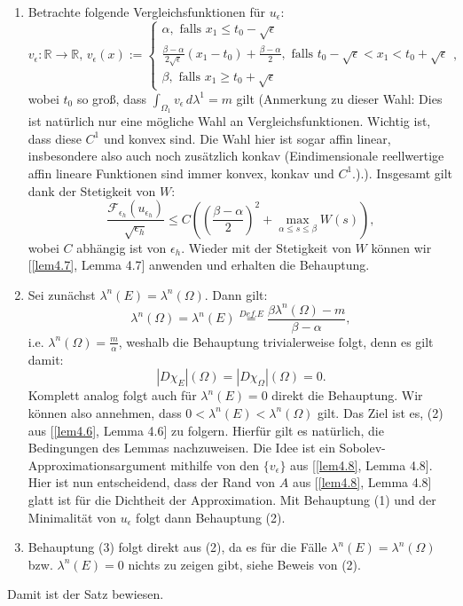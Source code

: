 \begin{enumerate}
\item Betrachte folgende Vergleichsfunktionen für \(u_{\epsilon}\):
\begin{equation}
    v_{\epsilon} : \mathbb{R} \to \mathbb{R}, \, v_{\epsilon}(x) := \begin{cases}
        \alpha, \text{ falls }x_1 \leq t_0 - \sqrt{\epsilon}\\
        \frac{\beta - \alpha}{2 \sqrt{\epsilon}}(x_1 - t_0) + \frac{\beta - \alpha}{2}, \text{ falls }t_0 - \sqrt{\epsilon} < x_1 < t_0 + \sqrt{\epsilon}\\
        \beta, \text{ falls }x_1 \geq t_0 + \sqrt{\epsilon}
    \end{cases},
\end{equation}
wobei \(t_0\) so groß, dass \(\int_{\Omega_1} v_{\epsilon} \, d\lambda^1 = m\) gilt (Anmerkung zu dieser Wahl: Dies ist natürlich nur eine mögliche Wahl an Vergleichsfunktionen. Wichtig ist, dass diese \(C^1\) und konvex sind. Die Wahl hier ist sogar affin linear, insbesondere also auch noch zusätzlich konkav (Eindimensionale reellwertige affin lineare Funktionen sind immer konvex, konkav und \(C^1\).).). Insgesamt gilt dank der Stetigkeit von \(W\):
\begin{equation}
    \frac{\mathcal{F}_{\epsilon_h}(u_{\epsilon_h})}{\sqrt{\epsilon_h}} \leq C((\frac{\beta - \alpha}{2})^2 + \max_{\alpha \leq s \leq \beta} W(s)),
\end{equation}
wobei \(C\) abhängig ist von \(\epsilon_h\). Wieder mit der Stetigkeit von \(W\) können wir [\ref{lem4.7}, Lemma 4.7] anwenden und erhalten die Behauptung.
\item Sei zunächst \(\lambda^n(E) = \lambda^n(\Omega)\). Dann gilt:
\begin{equation}
    \lambda^n(\Omega) = \lambda^n(E) \stackrel{Def. E}{=} \frac{\beta \lambda^n(\Omega) - m}{\beta - \alpha},
\end{equation}
i.e. \(\lambda^n(\Omega) = \frac{m}{\alpha}\), weshalb die Behauptung trivialerweise folgt, denn es gilt damit:
\begin{equation}
    |D\chi_E|(\Omega) = |D\chi_{\Omega}|(\Omega) = 0.
\end{equation}
Komplett analog folgt auch für \(\lambda^n(E) = 0\) direkt die Behauptung. Wir können also annehmen, dass \(0 < \lambda^n(E) < \lambda^n(\Omega)\) gilt. Das Ziel ist es, (2) aus [\ref{lem4.6}, Lemma 4.6] zu folgern. Hierfür gilt es natürlich, die Bedingungen des Lemmas nachzuweisen. Die Idee ist ein Sobolev-Approximationsargument mithilfe von den \(\{v_{\epsilon}\}\) aus [\ref{lem4.8}, Lemma 4.8]. Hier ist nun entscheidend, dass der Rand von \(A\) aus [\ref{lem4.8}, Lemma 4.8] glatt ist für die Dichtheit der Approximation. Mit Behauptung (1) und der Minimalität von \(u_{\epsilon}\) folgt dann Behauptung (2).
\item Behauptung (3) folgt direkt aus (2), da es für die Fälle \(\lambda^n(E) = \lambda^n(\Omega)\) bzw. \(\lambda^n(E) = 0\) nichts zu zeigen gibt, siehe Beweis von (2).
\end{enumerate}
Damit ist der Satz bewiesen. \QEDB


